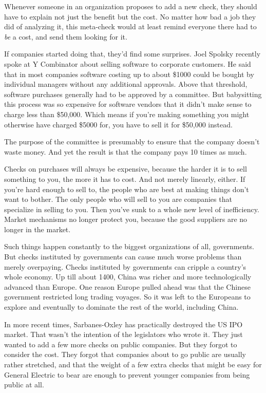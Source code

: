 \documentclass[12pt]{book}
\begin{document}
Whenever someone in an organization proposes to add a new check, they
should have to explain not just the benefit but the cost. No matter how
bad a job they did of analyzing it, this meta-check would at least
remind everyone there had to \emph{be} a cost, and send them looking for
it.

If companies started doing that, they'd find some surprises. Joel
Spolsky recently spoke at Y Combinator about selling software to
corporate customers. He said that in most companies software costing up
to about \$1000 could be bought by individual managers without any
additional approvals. Above that threshold, software purchases generally
had to be approved by a committee. But babysitting this process was so
expensive for software vendors that it didn't make sense to charge less
than \$50,000. Which means if you're making something you might
otherwise have charged \$5000 for, you have to sell it for \$50,000
instead.

The purpose of the committee is presumably to ensure that the company
doesn't waste money. And yet the result is that the company pays 10
times as much.

Checks on purchases will always be expensive, because the harder it is
to sell something to you, the more it has to cost. And not merely
linearly, either. If you're hard enough to sell to, the people who are
best at making things don't want to bother. The only people who will
sell to you are companies that specialize in selling to you. Then you've
sunk to a whole new level of inefficiency. Market mechanisms no longer
protect you, because the good suppliers are no longer in the market.

Such things happen constantly to the biggest organizations of all,
governments. But checks instituted by governments can cause much worse
problems than merely overpaying. Checks instituted by governments can
cripple a country's whole economy. Up till about 1400, China was richer
and more technologically advanced than Europe. One reason Europe pulled
ahead was that the Chinese government restricted long trading voyages.
So it was left to the Europeans to explore and eventually to dominate
the rest of the world, including China.

In more recent times, Sarbanes-Oxley has practically destroyed the US
IPO market. That wasn't the intention of the legislators who wrote it.
They just wanted to add a few more checks on public companies. But they
forgot to consider the cost. They forgot that companies about to go
public are usually rather stretched, and that the weight of a few extra
checks that might be easy for General Electric to bear are enough to
prevent younger companies from being public at all.
\end{document}
